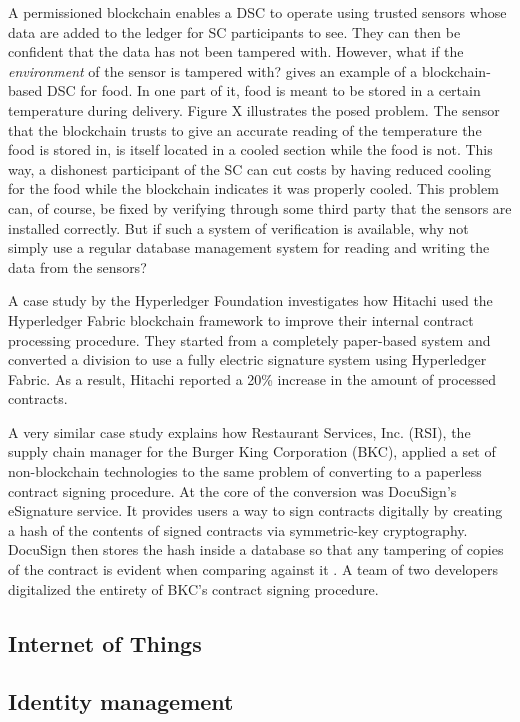 A permissioned blockchain enables a DSC to operate using trusted
sensors whose data are added to the ledger for SC participants to see.
They can then be confident that the data has not been tampered with.
However, what if the \textit{environment} of the sensor is tampered
with? \cite{wustBlockchainNeed} gives an example of a blockchain-based
DSC for food. In one part of it, food is meant to be stored in a
certain temperature during delivery. Figure X illustrates the posed
problem. The sensor that the blockchain trusts to give an accurate
reading of the temperature the food is stored in, is itself located in
a cooled section while the food is not. This way, a dishonest
participant of the SC can cut costs by having reduced cooling for the
food while the blockchain indicates it was properly cooled. This
problem can, of course, be fixed by verifying through some third party
that the sensors are installed correctly. But if such a system of
verification is available, why not simply use a regular database
management system for reading and writing the data from the sensors?


A case study by the Hyperledger Foundation \cite{hyperledgerHitachi}
investigates how Hitachi used the Hyperledger Fabric blockchain framework
to improve their internal contract processing procedure. They started
from a completely paper-based system and converted a division to use
a fully electric signature system using Hyperledger Fabric. As a result,
Hitachi reported a 20\% increase in the amount of processed contracts.

A very similar case study \cite{docusignBurger} explains how
Restaurant Services, Inc. (RSI), the supply chain manager for the
Burger King Corporation (BKC), applied a set of non-blockchain technologies
to the same problem of converting to a paperless contract signing
procedure. At the core of the conversion was DocuSign's eSignature
service. It provides users a way to sign contracts digitally by
creating a hash of the contents of signed contracts via symmetric-key
cryptography. DocuSign then stores the hash inside a database so that
any tampering of copies of the contract is evident when comparing
against it \cite{docusignHow}. A team of two developers digitalized
the entirety of BKC's contract signing procedure.



\subsection{Internet of Things}

\subsection{Identity management}

\subsection{}